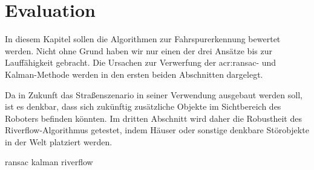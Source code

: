 \chapter{Evaluation \dcfirstauthorshort}
\label{cha:evaluation}

In diesem Kapitel sollen die Algorithmen zur Fahrspurerkennung bewertet werden. Nicht ohne Grund haben wir nur einen der drei Ansätze bis zur Lauffähigkeit gebracht. Die Ursachen zur Verwerfung der \gls{acr:ransac}- und Kalman-Methode werden in den ersten beiden Abschnitten dargelegt. 

Da in Zukunft das Straßenszenario in seiner Verwendung ausgebaut werden soll, ist es denkbar, dass sich zukünftig zusätzliche Objekte im Sichtbereich des Roboters befinden könnten. Im dritten Abschnitt wird daher die Robustheit des Riverflow-Algorithmus getestet, indem Häuser oder sonstige denkbare Störobjekte in der Welt platziert werden.

{ransac}
{kalman}
{riverflow}
